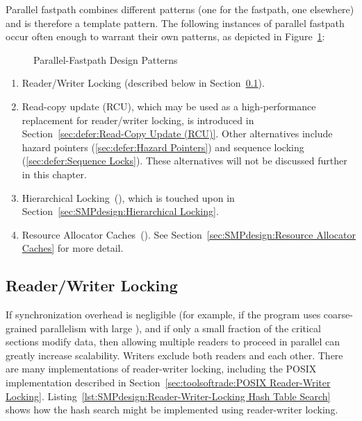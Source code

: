 Parallel fastpath combines different patterns (one for the
fastpath, one elsewhere) and is therefore a template pattern.
The following instances of parallel
fastpath occur often enough to warrant their own patterns,
as depicted in Figure~\ref{fig:SMPdesign:Parallel-Fastpath Design Patterns}:

\begin{figure}
\centering
{}
\caption{Parallel-Fastpath Design Patterns}
\label{fig:SMPdesign:Parallel-Fastpath Design Patterns}
\end{figure}

\begin{enumerate}
\item	Reader/Writer Locking
	(described below in Section~\ref{sec:SMPdesign:Reader/Writer Locking}).
\item	Read-copy update (RCU), which may be used as a high-performance
	replacement for reader/writer locking, is introduced in
	Section~\ref{sec:defer:Read-Copy Update (RCU)}.
	Other alternatives include hazard pointers
	(\cref{sec:defer:Hazard Pointers})
	and sequence locking (\cref{sec:defer:Sequence Locks}).
	These alternatives will not be discussed further in this chapter.
\item   Hierarchical Locking~(\cite{McKenney95b}), which is touched upon
	in Section~\ref{sec:SMPdesign:Hierarchical Locking}.
\item	Resource Allocator Caches~(\cite{McKenney95b,McKenney93}).
	See Section~\ref{sec:SMPdesign:Resource Allocator Caches}
	for more detail.
\end{enumerate}

\subsection{Reader/Writer Locking}
\label{sec:SMPdesign:Reader/Writer Locking}

If synchronization overhead is negligible (for example, if the program
uses coarse-grained parallelism with large ), and if
only a small fraction of the critical sections modify data, then allowing
multiple readers to proceed in parallel can greatly increase scalability.
Writers exclude both readers and each other.
There are many implementations of reader-writer locking, including
the POSIX implementation described in
Section~\ref{sec:toolsoftrade:POSIX Reader-Writer Locking}.
Listing~\ref{lst:SMPdesign:Reader-Writer-Locking Hash Table Search}
shows how the hash search might be implemented using reader-writer locking.

